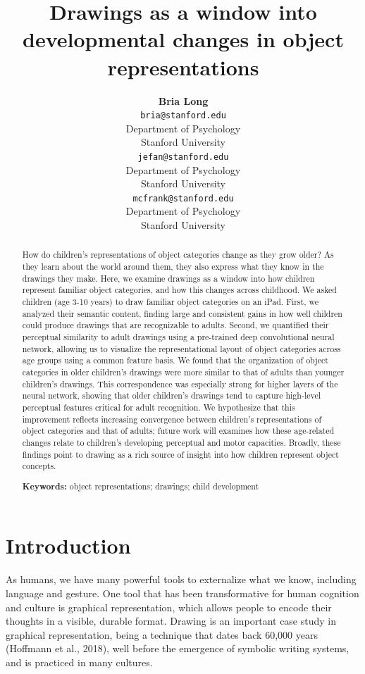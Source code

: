 \documentclass[10pt, letterpaper]{article}
\title{Drawings as a window into developmental changes in object
representations}
\author{{\large \bf Bria Long} \\ \texttt{bria@stanford.edu} \\ Department of Psychology \\ Stanford University \And {\large \bf Judith E. Fan} \\ \texttt{jefan@stanford.edu} \\ Department of Psychology \\ Stanford University \And {\large \bf Michael C. Frank } \\ \texttt{mcfrank@stanford.edu} \\ Department of Psychology \\ Stanford University}
\begin{document}
\maketitle

\begin{abstract}
How do children's representations of object categories change as they
grow older? As they learn about the world around them, they also express
what they know in the drawings they make. Here, we examine drawings as a
window into how children represent familiar object categories, and how
this changes across childhood. We asked children (age 3-10 years) to
draw familiar object categories on an iPad. First, we analyzed their
semantic content, finding large and consistent gains in how well
children could produce drawings that are recognizable to adults. Second,
we quantified their perceptual similarity to adult drawings using a
pre-trained deep convolutional neural network, allowing us to visualize
the representational layout of object categories across age groups using
a common feature basis. We found that the organization of object
categories in older children's drawings were more similar to that of
adults than younger children's drawings. This correspondence was
especially strong for higher layers of the neural network, showing that
older children's drawings tend to capture high-level perceptual features
critical for adult recognition. We hypothesize that this improvement
reflects increasing convergence between children's representations of
object categories and that of adults; future work will examines how
these age-related changes relate to children's developing perceptual and
motor capacities. Broadly, these findings point to drawing as a rich
source of insight into how children represent object concepts.

\textbf{Keywords:}
object representations; drawings; child development
\end{abstract}

\newcommand{\wrapmf}[1]{#1} 





\section{Introduction}\label{introduction}

As humans, we have many powerful tools to externalize what we know,
including language and gesture. One tool that has been transformative
for human cognition and culture is graphical representation, which
allows people to encode their thoughts in a visible, durable format.
Drawing is an important case study in graphical representation, being a
technique that dates back 60,000 years (Hoffmann et al., 2018), well
before the emergence of symbolic writing systems, and is practiced in
many cultures.
\end{document}
